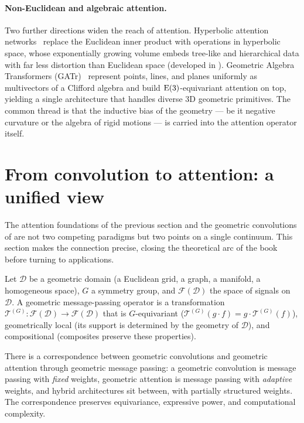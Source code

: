 \paragraph{Non-Euclidean and algebraic attention.}
Two further directions widen the reach of attention. Hyperbolic attention
networks~\citep{gulcehre2019hyperbolic} replace the Euclidean inner product with
operations in hyperbolic space, whose exponentially growing volume embeds
tree-like and hierarchical data with far less distortion than Euclidean space
(developed in ). Geometric Algebra Transformers
(GATr)~\citep{brehmer2023geometric} represent points, lines, and planes uniformly
as multivectors of a Clifford algebra and build $\mathrm{E}(3)$-equivariant attention
on top, yielding a single architecture that handles diverse 3D geometric
primitives. The common thread is that the inductive bias of the geometry --- be
it negative curvature or the algebra of rigid motions --- is carried into the
attention operator itself.

\section{From convolution to attention: a unified view}
\label{sec:apps:cnn-attention}

The attention foundations of the previous section and the geometric convolutions
of  are not two competing paradigms but two
points on a single continuum. This section makes the connection precise, closing
the theoretical arc of the book before turning to applications.

\begin{definition}
\label{def:apps:geom-mp}
Let $\mathcal{D}$ be a geometric domain (a Euclidean grid, a graph, a manifold,
a homogeneous space), $G$ a symmetry group, and $\mathcal{F}(\mathcal{D})$ the
space of signals on $\mathcal{D}$. A geometric message-passing operator is a
transformation $\mathcal{T}^{(G)}:\mathcal{F}(\mathcal{D})\to\mathcal{F}(\mathcal{D})$
that is $G$-equivariant ($\mathcal{T}^{(G)}(g\cdot f) = g\cdot\mathcal{T}^{(G)}(f)$),
geometrically local (its support is determined by the geometry of
$\mathcal{D}$), and compositional (composites preserve these properties).
\end{definition}

\begin{theorem}
\label{thm:apps:cnn-attn-correspondence}
There is a correspondence between geometric convolutions and geometric attention
through geometric message passing: a geometric convolution is message passing
with \emph{fixed} weights, geometric attention is message passing with
\emph{adaptive} weights, and hybrid architectures sit between, with partially
structured weights. The correspondence preserves equivariance, expressive power,
and computational complexity.
\end{theorem}

